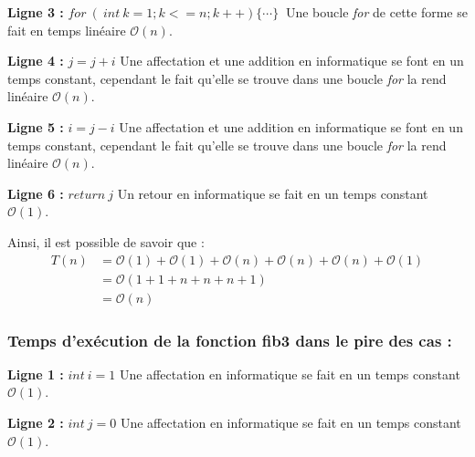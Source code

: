 \documentclass[12pt]{article}
\begin{document}
        \noindent \textbf{Ligne 3 :}  \( for\: (\:int \: k=1;k<=n;k++) \{ \cdots \} \: \) \newline
        Une boucle \textit{for} de cette forme se fait en temps linéaire 
        \( \mathcal{O}(n) \). \newline
        
        \noindent \textbf{Ligne 4 :} \( j=j+i \) \newline
        Une affectation et une addition en informatique se font en un temps constant, \newline
        cependant le fait qu'elle se trouve dans une boucle \textit{for} la rend linéaire
        \( \mathcal{O}(n) \). \newline

        \noindent \textbf{Ligne 5 :} \( i = j-i \) \newline
  	    Une affectation et une addition en informatique se font en un temps constant, \newline
        cependant le fait qu'elle se trouve dans une boucle \textit{for} la rend linéaire
        \( \mathcal{O}(n) \). \newline
    
        \noindent \textbf{Ligne 6 :} \( return \: j \) \newline
  	    Un retour en informatique se fait en un temps constant
        \( \mathcal{O}(1) \). \newline

        \noindent Ainsi, il est possible de savoir que : 
	    \begin{align*}
	       T(n) &= \mathcal{O}(1)+\mathcal{O}(1)+\mathcal{O}(n)+\mathcal{O}(n)+\mathcal{O}(n)+\mathcal{O}(1) \\
	   	   &= \mathcal{O}(1+1+n+n+n+1) \\
	       &= \mathcal{O}(n)
	    \end{align*}	    
      
      \subsubsection*{Temps d'exécution de la fonction fib3 dans le pire des cas :}
  	    
  	    \noindent \textbf{Ligne 1 :} \( int \: i = 1 \) \newline
        Une affectation en informatique se fait en un temps constant
        \( \mathcal{O}(1) \). \newline

        \noindent \textbf{Ligne 2 :} \( int \: j = 0 \) \newline
        Une affectation en informatique se fait en un temps constant
        \( \mathcal{O}(1) \). \newline
        
\end{document}
